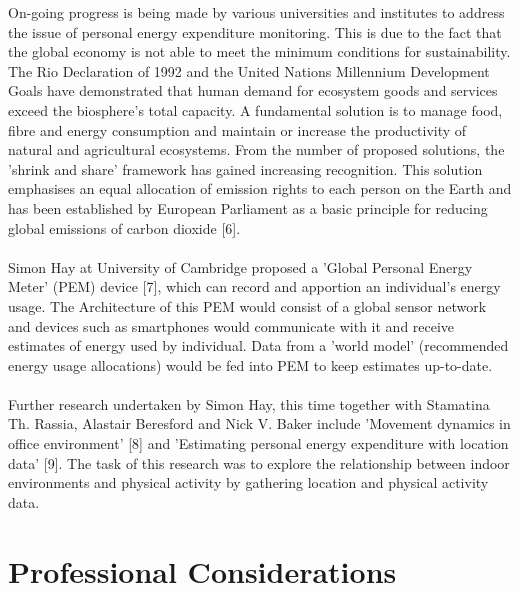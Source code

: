 \documentclass[12pt, a4paper]{report}   %
\begin{document}
On-going progress is being made by various universities and institutes to address the issue of personal energy expenditure monitoring. This is due to the fact that the global economy is not able to meet the minimum conditions for sustainability. The Rio Declaration of 1992 and the United Nations Millennium Development Goals have demonstrated that human demand for ecosystem goods and services exceed the biosphere's total capacity. A fundamental solution is to manage food, fibre and energy consumption and maintain or increase the productivity of natural and agricultural ecosystems. From the number of proposed solutions, the 'shrink and share' framework has gained increasing recognition. This solution emphasises an equal allocation of emission rights to each person on the Earth and has been established by European Parliament as a basic principle for reducing global emissions of carbon dioxide [6].\\ \\
Simon Hay at University of Cambridge proposed a 'Global Personal Energy Meter' (PEM) device [7], which can record and apportion an individual's energy usage. The Architecture of this PEM would consist of a global sensor network and devices such as smartphones would communicate with it and receive estimates of energy used by individual. Data from a 'world model' (recommended energy usage allocations) would be fed into PEM to keep estimates up-to-date.\\ \\
Further research undertaken by Simon Hay, this time together with Stamatina Th. Rassia, Alastair Beresford and Nick V. Baker include 'Movement dynamics in office environment' [8] and 'Estimating personal energy expenditure with location data' [9]. The task of this research was to explore the relationship between indoor environments and physical activity by gathering location and physical activity data.


\chapter{Professional Considerations}
\end{document}
